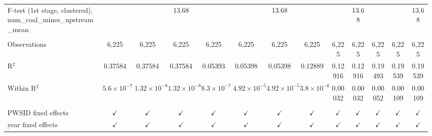 \begin{table}[htbp]
\begin{adjustbox}{width = \textwidth, center}
\begin{tabular}{lcccccccccccc}
         F-test (1st stage, clustered), num\_coal\_mines\_upstream\_mean     &                      &                       & 13.68                 &                      &                       & 13.68                 &                      &               & 13.68         &               &               & 13.68\\  
         
          \\
         
         Observations                                                        & 6,225                & 6,225                 & 6,225                 & 6,225                & 6,225                 & 6,225                 & 6,225                & 6,225         & 6,225         & 6,225         & 6,225         & 6,225\\  
         R$^2$                                                               & 0.37584              & 0.37584               & 0.37584               & 0.05393              & 0.05398               & 0.05398               & 0.12889              & 0.12916       & 0.12916       & 0.19493       & 0.19539       & 0.19539\\  
         Within R$^2$                                                        & $5.6\times 10^{-7}$  & $1.32\times 10^{-8}$  & $1.32\times 10^{-8}$  & $8.3\times 10^{-7}$  & $4.92\times 10^{-5}$  & $4.92\times 10^{-5}$  & $3.8\times 10^{-6}$  & 0.00032       & 0.00032       & 0.00052       & 0.00109       & 0.00109\\  
         
          \\
         
         PWSID fixed effects                                                 & $\checkmark$         & $\checkmark$          & $\checkmark$          & $\checkmark$         & $\checkmark$          & $\checkmark$          & $\checkmark$         & $\checkmark$  & $\checkmark$  & $\checkmark$  & $\checkmark$  & $\checkmark$\\   
         year fixed effects                                                  & $\checkmark$         & $\checkmark$          & $\checkmark$          & $\checkmark$         & $\checkmark$          & $\checkmark$          & $\checkmark$         & $\checkmark$  & $\checkmark$  & $\checkmark$  & $\checkmark$  & $\checkmark$\\   
         
         \bottomrule
         
      \end{tabular}
      

\end{adjustbox}
\end{table}
